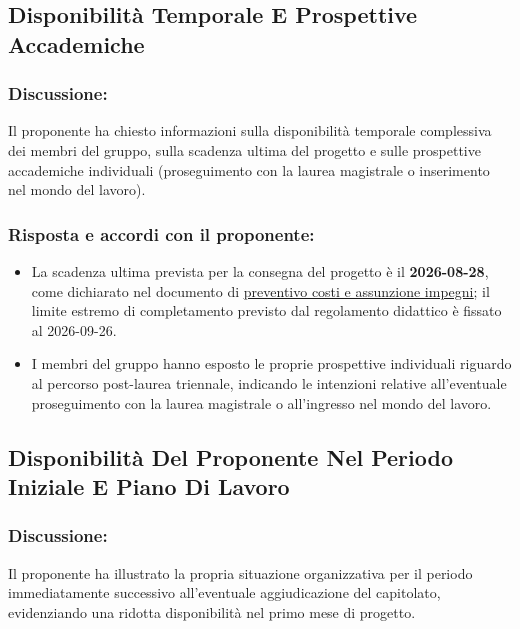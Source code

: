 \subsection{Disponibilità Temporale E Prospettive Accademiche}
 
\subsubsection*{Discussione:}
Il proponente ha chiesto informazioni sulla disponibilità temporale complessiva
dei membri del gruppo, sulla scadenza ultima del progetto e sulle prospettive
accademiche individuali (proseguimento con la laurea magistrale o inserimento
nel mondo del lavoro).
 
\subsubsection*{Risposta e accordi con il proponente:}
 
\begin{itemize}
    \item La scadenza ultima prevista per la consegna del progetto è il
      \textbf{2026-08-28}, come dichiarato nel documento di
      \href{https://synergo-unit-unipd.github.io/Second-Brain/docs/CC/doc_gestionali/doc_esterni/preventivo_costi_assunzione_impegni/preventivo_costi_e_assunzione_impegni.pdf}
      {\underline{preventivo costi e assunzione impegni}};
      il limite estremo di completamento previsto dal regolamento didattico
      è fissato al 2026-09-26.
    \item I membri del gruppo hanno esposto le proprie prospettive individuali
          riguardo al percorso post-laurea triennale, indicando le intenzioni
          relative all'eventuale proseguimento con la laurea magistrale o
          all'ingresso nel mondo del lavoro.
\end{itemize}
 
\subsection{Disponibilità Del Proponente Nel Periodo Iniziale E Piano Di Lavoro}
 
\subsubsection*{Discussione:}
Il proponente ha illustrato la propria situazione organizzativa per il periodo
immediatamente successivo all'eventuale aggiudicazione del capitolato,
evidenziando una ridotta disponibilità nel primo mese di progetto.
 
